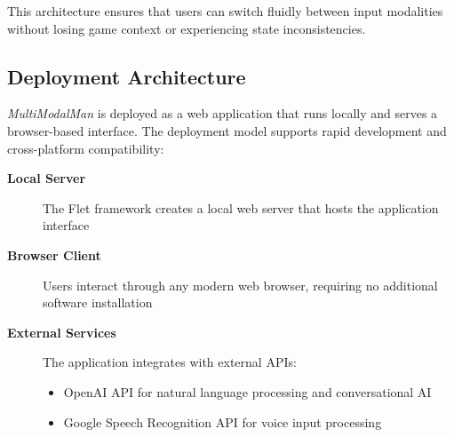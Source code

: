 This architecture ensures that users can switch fluidly between input modalities without losing game context or experiencing state inconsistencies.

\subsection*{Deployment Architecture}

\textit{MultiModalMan} is deployed as a web application that runs locally and serves a browser-based interface. The deployment model supports rapid development and cross-platform compatibility:

\begin{description}
\item[\textbf{Local Server}] The Flet framework creates a local web server that hosts the application interface
\item[\textbf{Browser Client}] Users interact through any modern web browser, requiring no additional software installation
\item[\textbf{External Services}] The application integrates with external APIs:
  \begin{itemize}
    \item OpenAI API for natural language processing and conversational AI
    \item Google Speech Recognition API for voice input processing
  \end{itemize}
\end{description}
